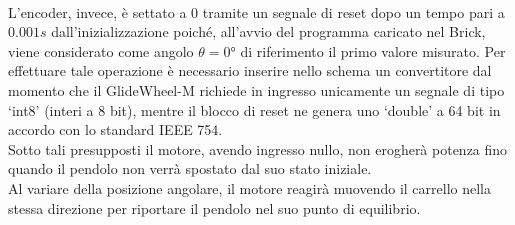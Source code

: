 \\L'encoder, invece, è settato a $0$ tramite un segnale di reset dopo un tempo pari a $0.001s$ dall'inizializzazione poiché, all'avvio del programma caricato nel Brick, viene considerato come angolo $\theta=\ang{0}$ di riferimento il primo valore misurato.
Per effettuare tale operazione è necessario inserire nello schema un convertitore dal momento che il GlideWheel-M richiede in ingresso unicamente un segnale di tipo `int8' (interi a 8 bit), mentre il blocco di reset ne genera uno `double' a 64 bit in accordo con lo standard IEEE 754.\\
Sotto tali presupposti il motore, avendo ingresso nullo, non erogherà potenza fino quando il pendolo non verrà spostato dal suo stato iniziale.\\
Al variare della posizione angolare, il motore reagirà muovendo il carrello nella stessa direzione per riportare il pendolo nel suo punto di equilibrio.

